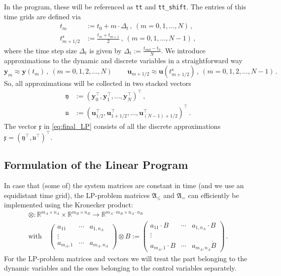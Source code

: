\documentclass{article}
\newcommand{\defeq}{\mathrel{:=}}%
\newcommand{\tp}{\top}%
\newcommand{\kron}{\otimes}%
\newcommand{\setR}{\mathbb{R}}%
\newcommand{\vectorfont}[1]{\boldsymbol{#1}}%
\newcommand{\matrixfont}[1]{\mathbf{#1}}%
\newcommand{\uvec}{\vectorfont{u}}
\newcommand{\yvec}{\vectorfont{y}}
\newcommand{\ufrakvec}{\vectorfont{\mathfrak{u}}}
\newcommand{\xfrakvec}{\vectorfont{\mathfrak{x}}}
\newcommand{\yfrakvec}{\vectorfont{\mathfrak{y}}}
\newcommand{\Afrakmat}{\matrixfont{\mathfrak{A}}}
\begin{document}
In the program, these will be referenced as \texttt{tt} and \texttt{tt\_shift}.
The entries of this time grids are defined via
\begin{equation*}
\begin{split}
t_m &\defeq t_0 + m \cdot \Delta_t \,,~(m = 0,1,\ldots, N)\,,
\\
t_{m+1/2}^{\mathrm{s}} &\defeq \frac{t_m + t_{m+1}}{2}\,,~(m=0,1,\ldots,N-1)\,,
\end{split}
\end{equation*}
where the time step size $\Delta_t$ is given by $\Delta_t \defeq \frac{t_{\mathrm{end}} - t_0}{N}$.
We introduce approximations to the dynamic and discrete variables in a straightforward way
\[
\yvec_m \approx \yvec (t_m)\,,~(m=0,1,2,\ldots,N)\,\qquad
\uvec_{m+1/2} \approx \uvec (t_{m+1/2}^{\mathrm{s}})\,,~(m=0,1,2,\ldots,N-1)\,.
\]
So, all approximations will be collected in two stacked vectors
\begin{equation*}
\begin{split}
\yfrakvec &\defeq (\yvec_0^{\tp}, \yvec_1^{\tp} , \ldots , \yvec_{N}^{\tp})^{\tp}\,,
\\
\ufrakvec &\defeq (\uvec_{1/2}^{\tp}, \uvec_{1+1/2}^{\tp}, \ldots , \uvec_{(N-1)+1/2}^{\tp})^{\tp}\,.
\end{split}
\end{equation*}
The vector $\xfrakvec$ in \eqref{eq:final_LP} consists of all the discrete approximations $\xfrakvec = (\yfrakvec^{\tp},\ufrakvec^{\tp})^{\tp}$.


\subsection*{Formulation of the Linear Program}

In case that (some of) the system matrices are constant in time (and we use an equidistant time grid), the LP-problem matrices $\Afrakmat_{\leq}$ and $\Afrakmat_{=}$ can efficiently be implemented using the Kronecker product:
\begin{multline*}
\kron \colon \setR^{m_A \times n_A} \times \setR^{m_B \times n_B} \to \setR^{m_A \cdot m_B \times n_A \cdot n_B}\\
\text{with}\quad
\begin{pmatrix} a_{11} & \cdots & a_{1,n_A} \\ \vdots \\ a_{m_A, 1} & \cdots & a_{m_A, n_A}\end{pmatrix}
\kron B \defeq 
\begin{pmatrix} a_{11}\cdot B & \cdots & a_{1,n_A}\cdot B \\ \vdots \\ a_{m_A, 1}\cdot B & \cdots & a_{m_A, n_A} \dot B\end{pmatrix}\,.
\end{multline*}
For the LP-problem matrices and vectors we will treat the part belonging to the dynamic variables and the ones belonging to the control variables separately.
\end{document}
